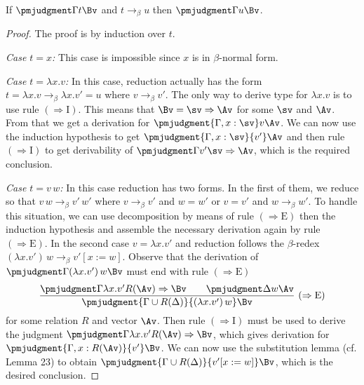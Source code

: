  If $\pmjudgment\Gamma t\Bv$ and $t\to_\beta u$ then $\pmjudgment\Gamma u\Bv$.
\begin{proof}
The proof is by induction over $t$.\par
\emph{Case $t=x$:} This case is impossible since $x$ is in $\beta$-normal form.\par
\emph{Case $t=\lambda x.v$:} In this case, reduction actually has the form $t=\lambda x.v\to_\beta\lambda x.v'=u$ where $v\to_\beta v'$. The only way to derive type for $\lambda x.v$ is to use rule $(\Rightarrow\mathrm I)$. This means that $\Bv=\sv\Rightarrow\Av$ for some $\sv$ and $\Av$. From that we get a derivation for $\pmjudgment{\Gamma,x:\sv}v\Av$. We can now use the induction hypothesis to get $\pmjudgment{\Gamma,x:\sv}{v'}\Av$ and then rule $(\Rightarrow\mathrm I)$ to get derivability of $\pmjudgment\Gamma{v'}{\sv\Rightarrow\Av}$, which is the required conclusion.\par
\emph{Case $t=v\,w$:} In this case reduction has two forms. In the first of them, we reduce so that $v\,w\to_\beta v'\,w'$ where $v\to_\beta v'$ and $w=w'$ or $v=v'$ and $w\to_\beta w'$. To handle this situation, we can use decomposition by means of rule $(\Rightarrow\mathrm E)$ then the induction hypothesis and assemble the necessary derivation again by rule $(\Rightarrow\mathrm E)$.
In the second case $v=\lambda x.v'$ and reduction follows the $\beta$-redex $(\lambda x.v')\,w\to_\beta v'[x:=w]$. Observe that the derivation of $\pmjudgment\Gamma{(\lambda x.v')\,w}\Bv$ must end with rule $(\Rightarrow\mathrm E)$
\[\frac{\pmjudgment\Gamma{\lambda x.v'}{R(\Av)\Rightarrow\Bv}\qquad\pmjudgment\Delta w\Av}{\pmjudgment{\Gamma\cup R(\Delta)}{(\lambda x.v')\,w}\Bv}\ (\Rightarrow\mathrm E)\]
for some relation $R$ and vector $\Av$. Then rule $(\Rightarrow\mathrm I)$ must be used to derive the judgment $\pmjudgment\Gamma{\lambda x.v'}{R(\Av)\Rightarrow\Bv}$, which gives derivation for $\pmjudgment{\Gamma,x:R(\Av)}{v'}\Bv$. We can now use the substitution lemma (cf. Lemma 23) to obtain $\pmjudgment{\Gamma\cup R(\Delta)}{v'[x:=w]}\Bv$, which is the desired conclusion.
\end{proof}
